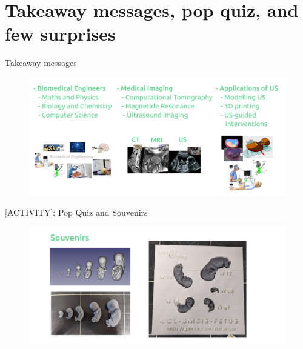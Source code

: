 \section{Takeaway messages, pop quiz, and few surprises}



{
\begin{frame}{Takeaway messages}
  \begin{figure}
  \centering
  \includegraphics[width=1.0\textwidth]{./../figures/takeaways/versions/drawing-v04}
  \end{figure}

\end{frame}
}

{
\begin{frame}{[\faUsers ACTIVITY]: Pop Quiz and Souvenirs}
  \begin{figure}
  \centering
  \includegraphics[width=1.0\textwidth]{./../figures/popquiz-souvenirs/versions/drawing-v03}
  \end{figure}

\end{frame}
}


